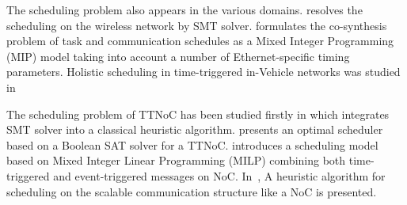 \documentclass[10pt,journal]{IEEEtran}
\theoremstyle{remark}
\begin{document}
The scheduling problem also appears in the various domains.
\cite{DBLP:conf/isorc/RoRM15} resolves the scheduling on the wireless network by SMT solver.
\cite{DBLP:conf/aspdac/ZhangG0C14} formulates the co-synthesis problem of task and communication schedules as a Mixed Integer Programming (MIP) model taking into account a number of Ethernet-specific timing parameters.
Holistic scheduling in time-triggered in-Vehicle networks was studied in~\cite{DBLP:journals/tii/HuLWLZ14}

The scheduling problem of TTNoC has been
studied firstly in \cite{DBLP:conf/date/HuangBRBK12} which integrates SMT solver into a classical heuristic algorithm. 
\cite{DBLP:conf/sies/ScholerKMO15} presents an optimal scheduler based on a Boolean SAT solver for a TTNoC.
\cite{DBLP:conf/indin/MurshedOAK15} introduces a scheduling model based on Mixed Integer Linear Programming (MILP) combining both time-triggered and event-triggered messages on NoC.
In~\cite{DBLP:conf/sies/FreierC15},
 A heuristic algorithm for scheduling on the scalable communication structure like a NoC is presented. 


%
%

\end{document}
